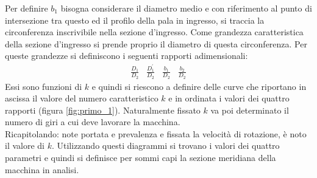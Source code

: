 Per definire $b_1$ bisogna considerare il diametro medio e con riferimento al punto di intersezione tra questo ed il profilo della pala in ingresso, si traccia la circonferenza inscrivibile nella sezione d’ingresso. Come grandezza caratteristica della sezione d’ingresso si prende proprio il diametro di questa circonferenza. Per queste grandezze si definiscono i seguenti rapporti adimensionali:
\begin{align*}
\frac{D_1}{D_2} \; \; \; \frac{D_1^{'}}{D_2} \; \; \; \frac{b_1}{D_2} \; \; \; \frac{b_2}{D_2} 
\end{align*}
Essi sono funzioni di $k$ e quindi si riescono a definire delle curve che riportano in ascissa il valore del numero caratteristico $k$ e in ordinata i valori dei quattro rapporti (figura \ref{fig:primo_1}). Naturalmente fissato $k$ va poi determinato il numero di giri a cui deve lavorare la macchina.\\
Ricapitolando: note portata e prevalenza e fissata la velocità di rotazione, è noto il valore di $k$. Utilizzando questi diagrammi si trovano i valori dei quattro parametri e quindi si definisce per sommi capi la sezione meridiana della macchina in analisi.

